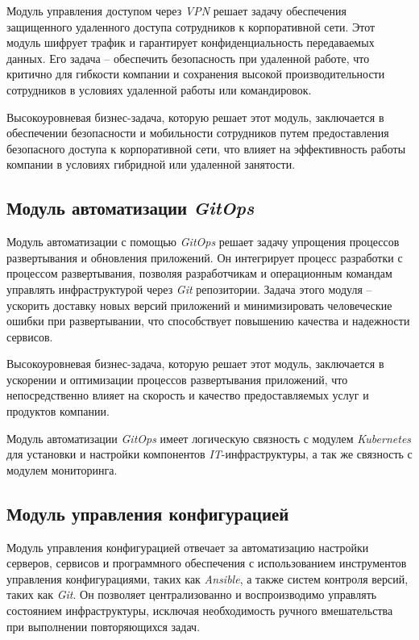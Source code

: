 Модуль управления доступом через \textit{VPN} решает задачу обеспечения защищенного удаленного доступа сотрудников к корпоративной сети. Этот модуль шифрует трафик и гарантирует конфиденциальность передаваемых данных. Его задача -- обеспечить безопасность при удаленной работе, что критично для гибкости компании и сохранения высокой производительности сотрудников в условиях удаленной работы или командировок.

Высокоуровневая бизнес-задача, которую решает этот модуль, заключается в обеспечении безопасности и мобильности сотрудников путем предоставления безопасного доступа к корпоративной сети, что влияет на эффективность работы компании в условиях гибридной или удаленной занятости.

\subsection{Модуль автоматизации \textit{GitOps}} 
\label{sec:gitops_automation_module}

Модуль автоматизации с помощью \textit{GitOps} решает задачу упрощения процессов развертывания и обновления приложений. Он интегрирует процесс разработки с процессом развертывания, позволяя разработчикам и операционным командам управлять инфраструктурой через 
\textit{Git} репозитории. Задача этого модуля -- ускорить доставку новых версий приложений и минимизировать человеческие ошибки при развертывании, что способствует повышению качества и надежности сервисов.

Высокоуровневая бизнес-задача, которую решает этот модуль, заключается в ускорении и оптимизации процессов развертывания приложений, что непосредственно влияет на скорость и качество предоставляемых услуг и продуктов компании.

Модуль автоматизации \textit{GitOps} имеет логическую связность с модулем \textit{Kubernetes} для установки и настройки компонентов \textit{IT}-инфраструктуры, а так же связность с модулем мониторинга.

\subsection{Модуль управления конфигурацией} 
\label{sec:configuration_management_module}

Модуль управления конфигурацией отвечает за автоматизацию настройки серверов, сервисов и программного обеспечения с использованием инструментов управления конфигурациями, таких как \textit{Ansible}, а также систем контроля версий, таких как \textit{Git}. Он позволяет централизованно и воспроизводимо управлять состоянием инфраструктуры, исключая необходимость ручного вмешательства при выполнении повторяющихся задач.


